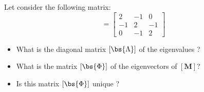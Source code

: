\bexo
Let consider the following matrix:
\begin{equation}
[\tb{M}]=\left[
\begin{array}{ccc}
{2}&{-1}&{0}\\
{-1}&{ 2}&{-1}\\
{0}&{ -1}&{2}
\end{array}	
\right]
\end{equation}
\begin{itemize}
	\item What is the diagonal matrix $[\bs{\Lambda}]$  of the eigenvalues ?
	\item What is the matrix $[\bs{\Phi}]$ of the eigenvectors of $[\textbf{M}]$? 
	\item Is this matrix $[\bs{\Phi}]$ unique ?
\end{itemize}


\eexo
\solution{ 
}